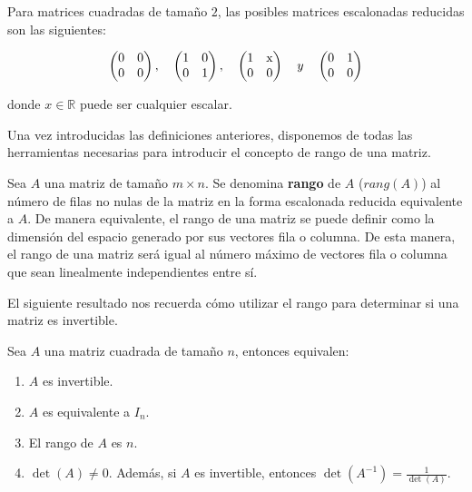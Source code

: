 \begin{ejemplo}
    Para matrices cuadradas de tamaño $2$, las posibles matrices escalonadas reducidas son las siguientes:

    \[
        \begin{pmatrix} 0 & 0 \\ 0 & 0 \end{pmatrix}, \quad
        \begin{pmatrix} 1 & 0 \\ 0 & 1 \end{pmatrix}, \quad
        \begin{pmatrix} 1 & $x$ \\ 0 & 0 \end{pmatrix} \quad y \quad
        \begin{pmatrix} 0 & 1 \\ 0 & 0
        \end{pmatrix}
    \]

    donde $x \in \mathbb{R}$ puede ser cualquier escalar.\newline
\end{ejemplo}

Una vez introducidas las definiciones anteriores, disponemos de todas las herramientas necesarias para introducir el concepto de rango de una matriz.

\begin{definicion}
    Sea $A$ una matriz de tamaño $m \times n$. Se denomina \textbf{rango} de $A$ ($rang(A)$) al número de filas no nulas de la matriz en la forma escalonada reducida equivalente a $A$. De manera equivalente, el rango de una matriz se puede definir como la dimensión del espacio generado por sus vectores fila o columna. De esta manera, el rango de una matriz será igual al número máximo de vectores fila o columna que sean linealmente independientes entre sí.\newline
\end{definicion}

El siguiente resultado nos recuerda cómo utilizar el rango para determinar si una matriz es invertible.

\begin{proposicion}
    Sea $A$ una matriz cuadrada de tamaño $n$, entonces equivalen:

    \begin{enumerate}
        \item $A$ es invertible.
        \item $A$ es equivalente a $I_n$.
        \item El rango de $A$ es $n$.
        \item $\det(A) \neq 0$. Además, si $A$ es invertible, entonces $\det(A^{-1})=\frac{1}{\det(A)}$.\newline
    \end{enumerate}
\end{proposicion}

